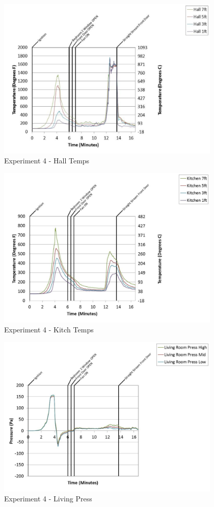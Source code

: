 \documentclass{article}
\begin{document}
\begin{appendices}
	\clearpage

	\begin{figure}[h!]
		\centering
		\includegraphics[height=3.05in]{0_Images/Results_Charts/Exp_4_Charts/HallTemps.pdf}
		\caption{Experiment 4 - Hall Temps}
	\end{figure}
 

	\begin{figure}[h!]
		\centering
		\includegraphics[height=3.05in]{0_Images/Results_Charts/Exp_4_Charts/KitchTemps.pdf}
		\caption{Experiment 4 - Kitch Temps}
	\end{figure}
 
	\clearpage

	\begin{figure}[h!]
		\centering
		\includegraphics[height=3.05in]{0_Images/Results_Charts/Exp_4_Charts/LivingPress.pdf}
		\caption{Experiment 4 - Living Press}
	\end{figure}
 


\end{appendices}
\end{document}
